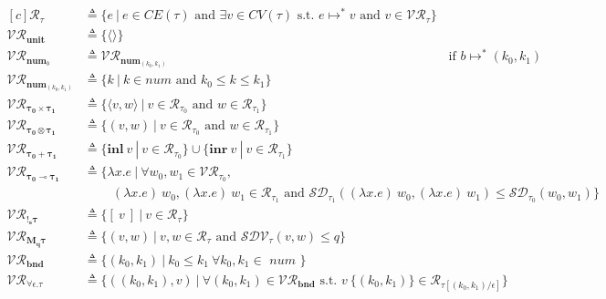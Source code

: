 \begin{definition}
  \begin{equation}
  \begin{aligned}[c]
    \mathcal{R_{\tau}} &\triangleq 
      \{ e \ | \ e \in CE(\tau) \text{ and } \exists v
        \in CV(\tau) \text{ s.t. } e \mapsto^{*} v \text{ and } v \in \mathcal{VR_{\tau}} 
      \} \\
    \mathcal{VR_{\mathbf{unit}}} &\triangleq \{ \langle \rangle \} \\
    \mathcal{VR}_{\mathbf{num}_{b}} &\triangleq 
      \mathcal{VR}_{\mathbf{num}_{(k_0, k_1)}} 
      \hspace{22em} \text{if } b \mapsto^* (k_0, k_1) \\
    \mathcal{VR}_{\mathbf{num}_{(k_0, k_1)}} &\triangleq 
      \{ k \ | \ k \in \mathit{num} \text{ and } k_0 \leq k \leq k_1 \} \\
    \mathcal{VR_{\mathbf{\tau_0 \times \tau_1}}} &\triangleq 
      \{ \langle v, w \rangle \ | 
        \ v \in \mathcal{R}_{\tau_0} \text{ and } w \in \mathcal{R}_{\tau_1}
      \} \\
    \mathcal{VR_{\mathbf{\tau_0 \otimes \tau_1}}} &\triangleq 
      \{ ( v, w ) \ | 
        \ v \in \mathcal{R}_{\tau_0} \text{ and } w \in \mathcal{R}_{\tau_1}
      \} \\
    \mathcal{VR_{\mathbf{\tau_0 + \tau_1}}} &\triangleq 
      \{ \mathbf{inl}~v \ | \ v \in \mathcal{R}_{\tau_0} \} 
      \cup
      \{ \mathbf{inr}~v \ | \ v \in \mathcal{R}_{\tau_1} \} \\
    \mathcal{VR_{\mathbf{\tau_0 \multimap \tau_1}}} &\triangleq 
      \{ \lambda x . e \ | \ \forall w_0, w_1 \in \mathcal{VR}_{\tau_0}, \\ & \quad \quad \ (\lambda x.e)~w_0, (\lambda x . e)~w_1 \in
      \mathcal{R}_{\tau_1} \text{ and } \mathcal{SD}_{\tau_1}((\lambda x . e)~w_0, (\lambda x . e)~w_1) \leq
      \mathcal{SD}_{\tau_0}(w_0, w_1) \} \\
    \mathcal{VR_{\mathbf{!_s \tau}}} &\triangleq 
      \{ [~v~] \ | \ v \in \mathcal{R}_{\tau} \} \\
    \mathcal{VR_{\mathbf{M_q \tau}}} &\triangleq 
      \{ (v, w) \ | \ v, w \in \mathcal{R}_{\tau} \text{ and } \mathcal{SDV}_{\tau}(v, w)
      \leq q \} \\
    \mathcal{VR}_{\textbf{bnd}} &\triangleq \{ (k_0, k_1) \ | \ k_0 \leq k_1 \ \forall k_0, k_1 \in
    \textit{ num } \} \\
    \mathcal{VR_{\forall \epsilon. \tau}} &\triangleq 
      \{ ((k_0, k_1), v) \ | \ \forall (k_0, k_1) \in
      \mathcal{VR}_{\textbf{bnd}} \text{ s.t. } v ~ \{(k_0, k_1)\} \in
      \mathcal{R}_{\tau[(k_0, k_1) / \epsilon]}\} \\
  \end{aligned}
  \end{equation}
\end{definition}

